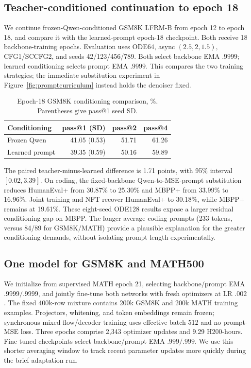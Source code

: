 \documentclass{article}
\newenvironment{revision}{\begingroup\color{blue}}{\endgroup}
\newcommand{\reviewrev}[1]{{\color{blue}#1}}
\begin{document}
\begin{revision}
\subsection{Teacher-conditioned continuation to epoch 18}
We continue frozen-Qwen-conditioned GSM8K LFRM-B from epoch 12 to epoch 18, and compare it with the learned-prompt epoch-18 checkpoint. Both receive 18 backbone-training epochs. Evaluation uses ODE64, async $(2.5,2,1.5)$, CFG1/SCCFG2, and seeds 42/123/456/789. Both select backbone EMA $.9999$; learned conditioning selects prompt EMA $.9999$. This compares the two training strategies; the immediate substitution experiment in Figure~\ref{fig:promptcurriculum} instead holds the denoiser fixed.
\begin{table}[htbp]\color{blue}\centering\small
\caption{Epoch-18 GSM8K conditioning comparison, \%. Parentheses give pass@1 seed SD.}
\label{tab:teachercontinuation}
\begin{tabular}{@{}lrrr@{}}\toprule
Conditioning & pass@1 (SD) & pass@2 & pass@4\\\midrule
Frozen Qwen & 41.05 (0.53) & 51.71 & 61.26\\
Learned prompt & 39.35 (0.59) & 50.16 & 59.89\\\bottomrule
\end{tabular}
\end{table}
The paired teacher-minus-learned difference is 1.71 points, with 95\% interval $[0.02,3.39]$. On coding, the fixed-backbone Qwen-to-MSE-prompt substitution reduces HumanEval+ from 30.87\% to 25.30\% and MBPP+ from 33.99\% to 16.96\%. Joint training and NFT recover HumanEval+ to 30.18\%, while MBPP+ remains at 19.61\%. These eight-seed ODE128 results expose a larger residual conditioning gap on MBPP. The longer average coding prompts (233 tokens, versus 84/89 for GSM8K/MATH) provide a plausible explanation for the greater conditioning demands, without isolating prompt length experimentally.

\subsection{One model for GSM8K and MATH500}
We initialize from supervised MATH epoch 21, selecting backbone/prompt EMA $.9999/.9999$, and jointly fine-tune both networks with fresh optimizers at LR $.002$. The fixed 400k-row mixture contains 200k GSM8K and 200k MATH training examples. Projectors, whitening, and token embeddings remain frozen; synchronous mixed flow/decoder training uses effective batch 512 and no prompt-MSE loss. Three epochs comprise 2,343 optimizer updates and 9.29 H200-hours. Fine-tuned checkpoints select backbone/prompt EMA $.999/.999$. \reviewrev{We use this shorter averaging window to track recent parameter updates more quickly during the brief adaptation run.}


\end{revision}
\end{document}
